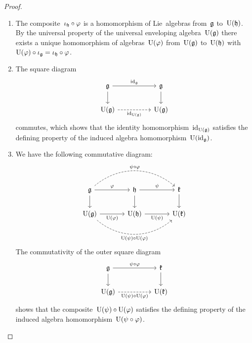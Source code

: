 \begin{proof}
  \leavevmode
  \begin{enumerate}
    \item
      The composite~$\iota_{\mathfrak{h}} \circ \varphi$ is a homomorphism of Lie~algebras from~$\mathfrak{g}$ to~$\operatorname{U}(\mathfrak{h})$.
      By the universal property of the universal enveloping algebra~$\operatorname{U}(\mathfrak{g})$ there exists a unique homomorphism of algebras~$\operatorname{U}(\varphi)$ from~$\operatorname{U}(\mathfrak{g})$ to~$\operatorname{U}(\mathfrak{h})$ with~$\operatorname{U}(\varphi) \circ \iota_{\mathfrak{g}} = \iota_{\mathfrak{h}} \circ \varphi$.
    \item
      The square diagram
      \[
        \begin{tikzcd}[column sep = huge]
          \glie
          \arrow{r}[above]{\id_{\glie}}
          \arrow{d}
          &
          \glie
          \arrow{d}
          \\
          \Univ(\glie)
          \arrow[dashed]{r}[below]{\id_{\Univ(\glie)}}
          &
          \Univ(\glie)
        \end{tikzcd}
      \]
      commutes, which shows that the identity homomorphism~$\mathrm{id}_{\operatorname{U}(\mathfrak{g})}$ satisfies the defining property of the induced algebra homomorphism~$\operatorname{U}( \mathrm{id}_{\mathfrak{g}} )$.
    \item
      We have the following commutative diagram:
      \[
        \begin{tikzcd}[column sep = large]
          \glie
          \arrow[dashed, bend left = 40]{rr}[above]{\psi \circ \varphi}
          \arrow{r}[above]{\varphi}
          \arrow{d}
          &
          \hlie
          \arrow{r}[above]{\psi}
          \arrow{d}
          &
          \klie
          \arrow{d}
          \\
          \Univ(\glie)
          \arrow{r}[below]{\Univ(\varphi)}
          \arrow[dashed, bend right = 40]{rr}[below]{\Univ(\psi) \circ \Univ(\varphi)}
          &
          \Univ(\hlie)
          \arrow{r}[below]{\Univ(\psi)}
          &
          \Univ(\klie)
        \end{tikzcd}
      \]
      The commutativity of the outer square diagram
      \[
        \begin{tikzcd}[column sep = huge]
          \glie
          \arrow{r}[above]{\psi \circ \varphi}
          \arrow{d}
          &
          \klie
          \arrow{d}
          \\
          \Univ(\glie)
          \arrow[dashed]{r}[below]{\Univ(\psi) \circ \Univ(\varphi)}
          &
          \Univ(\klie)
        \end{tikzcd}
      \]
      shows that the composite~$\operatorname{U}(\psi) \circ \operatorname{U}(\varphi)$ satisfies the defining property of the induced algebra homomorphism~$\operatorname{U}(\psi \circ \varphi)$.
    \qedhere
  \end{enumerate}
\end{proof}


